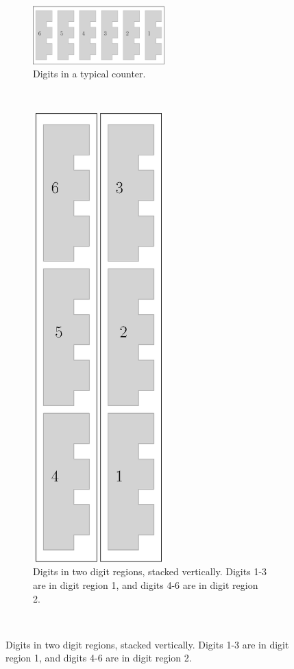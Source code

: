 \begin{figure}[H]
    \centering
    \caption{\label{fig:comparison_of_digits_in_different_counters}Digits in a typical counter vs. digits separated into digit regions.}
    \begin{subfigure}[t]{0.49\textwidth}
        \centering
        \includegraphics[width=2in]{digits_normal_counter}
        \caption{\label{fig:digits_normal_counter} Digits in a typical counter.}
    \end{subfigure}%
    ~
    \begin{subfigure}[t]{0.49\textwidth}
        \centering
        \includegraphics[width=2in]{digits_digit_region_counter}
        \caption{\label{fig:digits_digit_region_counter} Digits in two digit regions, stacked vertically.
        Digits 1-3 are in digit region 1, and digits 4-6 are in digit region 2.}
    \end{subfigure}%
    ~
\end{figure}

